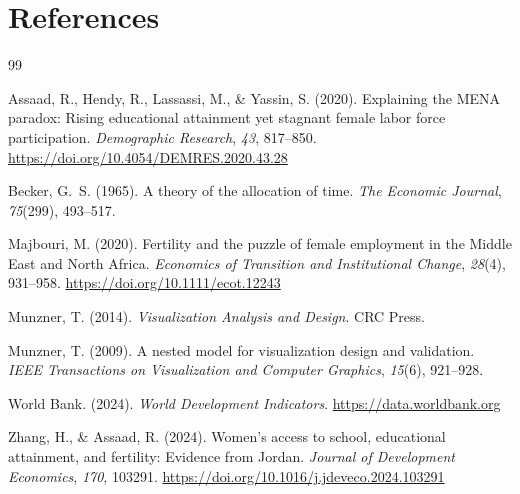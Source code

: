 \documentclass[12pt,a4paper]{article}
\begin{document}
\section*{References}
\begin{thebibliography}{99}

Assaad, R., Hendy, R., Lassassi, M., \& Yassin, S. (2020).
Explaining the MENA paradox: Rising educational attainment yet stagnant female labor force participation.
\textit{Demographic Research}, \textit{43}, 817--850.
\url{https://doi.org/10.4054/DEMRES.2020.43.28}

Becker, G.~S. (1965).
A theory of the allocation of time.
\textit{The Economic Journal}, \textit{75}(299), 493--517.

Majbouri, M. (2020).
Fertility and the puzzle of female employment in the Middle East and North Africa.
\textit{Economics of Transition and Institutional Change}, \textit{28}(4), 931--958.
\url{https://doi.org/10.1111/ecot.12243}

Munzner, T. (2014).
\textit{Visualization Analysis and Design}.
CRC Press.

Munzner, T. (2009).
A nested model for visualization design and validation.
\textit{IEEE Transactions on Visualization and Computer Graphics}, \textit{15}(6), 921--928.

World Bank. (2024).
\textit{World Development Indicators}.
\url{https://data.worldbank.org}

Zhang, H., \& Assaad, R. (2024).
Women's access to school, educational attainment, and fertility: Evidence from Jordan.
\textit{Journal of Development Economics}, \textit{170}, 103291.
\url{https://doi.org/10.1016/j.jdeveco.2024.103291}

\end{thebibliography}
\end{document}
